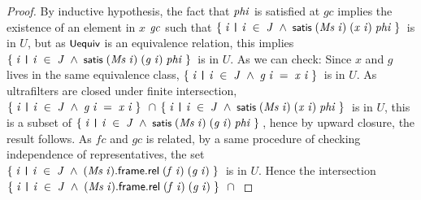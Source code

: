 \documentclass[letterpaper]{article}
\renewcommand{\HOLConst}[1]{{\textsf{\upshape\small #1}}}
\renewcommand{\HOLinline}[1]{\ensuremath{#1}}
\begin{document}
\begin{proof}
By inductive hypothesis, the fact that \HOLinline{\HOLFreeVar{phi}} is satisfied at $gc$ implies the existence of an element in $x$ \HOLinline{\HOLFreeVar{gc}} such that \HOLinline{\HOLTokenLeftbrace{}\HOLBoundVar{i}\;\HOLTokenBar{}\;\HOLBoundVar{i}\;\HOLSymConst{\HOLTokenIn{}}\;\HOLFreeVar{J}\;\HOLSymConst{\HOLTokenConj{}}\;\HOLConst{satis}\;(\HOLFreeVar{Ms}\;\HOLBoundVar{i})\;(\HOLFreeVar{x}\;\HOLBoundVar{i})\;\HOLFreeVar{phi}\HOLTokenRightbrace{}} is in $U$, but as \HOLinline{\HOLConst{Uequiv}} is an equivalence relation, this implies \HOLinline{\HOLTokenLeftbrace{}\HOLBoundVar{i}\;\HOLTokenBar{}\;\HOLBoundVar{i}\;\HOLSymConst{\HOLTokenIn{}}\;\HOLFreeVar{J}\;\HOLSymConst{\HOLTokenConj{}}\;\HOLConst{satis}\;(\HOLFreeVar{Ms}\;\HOLBoundVar{i})\;(\HOLFreeVar{g}\;\HOLBoundVar{i})\;\HOLFreeVar{phi}\HOLTokenRightbrace{}} is in $U$. As we can check: Since $x$ and $g$ lives in the same equivalence class, \HOLinline{\HOLTokenLeftbrace{}\HOLBoundVar{i}\;\HOLTokenBar{}\;\HOLBoundVar{i}\;\HOLSymConst{\HOLTokenIn{}}\;\HOLFreeVar{J}\;\HOLSymConst{\HOLTokenConj{}}\;\HOLFreeVar{g}\;\HOLBoundVar{i}\;\HOLSymConst{=}\;\HOLFreeVar{x}\;\HOLBoundVar{i}\HOLTokenRightbrace{}} is in $U$. As ultrafilters are closed under finite intersection, \HOLinline{\HOLTokenLeftbrace{}\HOLBoundVar{i}\;\HOLTokenBar{}\;\HOLBoundVar{i}\;\HOLSymConst{\HOLTokenIn{}}\;\HOLFreeVar{J}\;\HOLSymConst{\HOLTokenConj{}}\;\HOLFreeVar{g}\;\HOLBoundVar{i}\;\HOLSymConst{=}\;\HOLFreeVar{x}\;\HOLBoundVar{i}\HOLTokenRightbrace{}\;\HOLSymConst{\HOLTokenInter{}}\\
\HOLTokenLeftbrace{}\HOLBoundVar{i}\;\HOLTokenBar{}\;\HOLBoundVar{i}\;\HOLSymConst{\HOLTokenIn{}}\;\HOLFreeVar{J}\;\HOLSymConst{\HOLTokenConj{}}\;\HOLConst{satis}\;(\HOLFreeVar{Ms}\;\HOLBoundVar{i})\;(\HOLFreeVar{x}\;\HOLBoundVar{i})\;\HOLFreeVar{phi}\HOLTokenRightbrace{}} is in $U$, this is a subset of  \HOLinline{\HOLTokenLeftbrace{}\HOLBoundVar{i}\;\HOLTokenBar{}\;\HOLBoundVar{i}\;\HOLSymConst{\HOLTokenIn{}}\;\HOLFreeVar{J}\;\HOLSymConst{\HOLTokenConj{}}\;\HOLConst{satis}\;(\HOLFreeVar{Ms}\;\HOLBoundVar{i})\;(\HOLFreeVar{g}\;\HOLBoundVar{i})\;\HOLFreeVar{phi}\HOLTokenRightbrace{}}, hence by upward closure, the result follows. As $fc$ and $gc$ is related, by a same procedure of checking independence of representatives, the set \HOLinline{\HOLTokenLeftbrace{}\HOLBoundVar{i}\;\HOLTokenBar{}\;\HOLBoundVar{i}\;\HOLSymConst{\HOLTokenIn{}}\;\HOLFreeVar{J}\;\HOLSymConst{\HOLTokenConj{}}\;(\HOLFreeVar{Ms}\;\HOLBoundVar{i}).\HOLFieldName{frame}.\HOLFieldName{rel}\;(\HOLFreeVar{f}\;\HOLBoundVar{i})\;(\HOLFreeVar{g}\;\HOLBoundVar{i})\HOLTokenRightbrace{}} is in $U$. Hence the intersection \HOLinline{\HOLTokenLeftbrace{}\HOLBoundVar{i}\;\HOLTokenBar{}\;\HOLBoundVar{i}\;\HOLSymConst{\HOLTokenIn{}}\;\HOLFreeVar{J}\;\HOLSymConst{\HOLTokenConj{}}\;(\HOLFreeVar{Ms}\;\HOLBoundVar{i}).\HOLFieldName{frame}.\HOLFieldName{rel}\;(\HOLFreeVar{f}\;\HOLBoundVar{i})\;(\HOLFreeVar{g}\;\HOLBoundVar{i})\HOLTokenRightbrace{}\;\HOLSymConst{\HOLTokenInter{}}\\
}
\end{proof}
\end{document}
